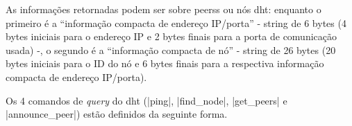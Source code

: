 As informações retornadas podem ser sobre \glspl*{peers} ou nós \gls*{dht}: enquanto o
primeiro é a \enquote{informação compacta de endereço IP/porta} - string de 6 bytes (4
bytes iniciais para o endereço IP e 2 bytes finais para a porta de comunicação usada)
-, o segundo é a \enquote{informação compacta de nó} - string de 26 bytes (20 bytes
iniciais para o ID do nó e 6 bytes finais para a respectiva informação compacta de
endereço IP/porta).

Os 4 comandos de \emph{query} do \gls*{dht} (\bverb|ping|, \bverb|find_node|,
\bverb|get_peers| e \bverb|announce_peer|) estão definidos da seguinte forma.

\newpage







